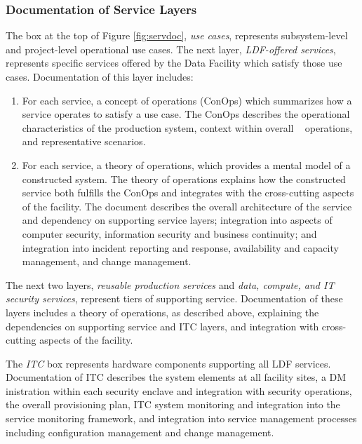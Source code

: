 \subsubsection{Documentation of Service Layers}

The box at the top of Figure \ref{fig:servdoc}, \textit{use cases}, represents subsystem-level and project-level operational use cases. The next layer, \textit{LDF-offered services}, represents specific services offered by the Data Facility which satisfy those use cases. Documentation of this layer includes:

\begin{enumerate}
\item	For each service, a concept of operations (ConOps) which summarizes how a service operates to satisfy a use case. The ConOps describes the operational characteristics of the production system, context within overall \VRO~ operations, and representative scenarios. 
\item	For each service, a theory of operations, which provides a mental model of a constructed system. The theory of operations explains how the constructed service both fulfills the ConOps and integrates with the cross-cutting aspects of the facility. The document describes the overall architecture of the service and dependency on supporting service layers; integration into aspects of computer security, information security and business continuity; and integration into incident reporting and response, availability and capacity management, and change management.
\end{enumerate}

The next two layers, \textit{reusable production services} and \textit{data, compute, and \gls{IT} security services}, represent tiers of supporting service. Documentation of these layers includes a theory of operations, as described above, explaining the dependencies on supporting service and \gls{ITC} layers, and integration with cross-cutting aspects of the facility.

The \textit{ITC} box represents hardware components supporting all \gls{LDF} services. Documentation of \gls{ITC} describes the system elements at all facility sites, a DM inistration within each security enclave and integration with security operations, the overall provisioning plan, \gls{ITC} system \gls{monitoring} and integration into the service \gls{monitoring} framework, and integration into service management processes including \gls{configuration} management and change management.


